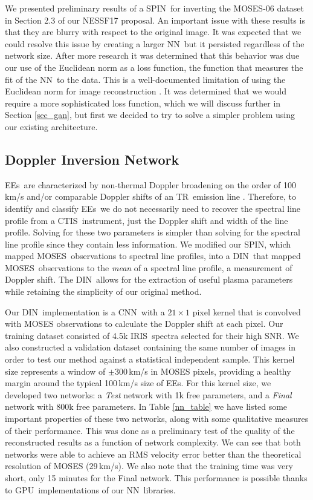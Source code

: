 \documentclass[10pt,letterpaper, doublespace]{article}
\newcommand{\TR}{\ac{TR}}
\newcommand{\EEs}{\acp{EE}}
\newcommand{\CTIS}{\ac{CTIS}}
\newcommand{\MOSES}{\ac{MOSES}}
\newcommand{\NN}{\ac{NN}}
\newcommand{\CNN}{\ac{CNN}}
\newcommand{\DIN}{\ac{DIN}}
\newcommand{\SPIN}{\ac{SPIN}}
\newcommand{\IRIS}{\ac{IRIS}}
\newcommand{\GPU}{\ac{GPU}}
\newcommand{\SNR}{\ac{SNR}}
\begin{document}
		We presented preliminary results of a \SPIN\ for inverting the \MOSES-06 dataset in Section 2.3 of our NESSF17 proposal.
		An important issue with these results is that they are blurry with respect to the original image.
		It was expected that we could resolve this issue by creating a larger \NN\, but it persisted regardless of the network size.
		After more research it was determined that this behavior was due our use of the Euclidean norm as a loss function, the function that measures the fit of the \NN\ to the data.
		This is a well-documented limitation of using the Euclidean norm for image reconstruction \citep{Pathak2016}.
		It was determined that we would require a more sophisticated loss function, which we will discuss further in Section \ref{sec_gan}, but first we decided to try to solve a simpler problem using our existing architecture.
					
		\subsection{Doppler Inversion Network}
		
			\EEs\ are characterized by non-thermal Doppler broadening on the order of 100\,km/s and/or comparable Doppler shifts of an \TR\ emission line \citep{Dere1989}.
			Therefore, to identify and classify \EEs\ we do not necessarily need to recover the spectral line profile from a \CTIS\ instrument, just the Doppler shift and width of the line profile.
			Solving for these two parameters is simpler than solving for the spectral line profile since they contain less information.
			We modified our \SPIN, which mapped \MOSES\ observations to spectral line profiles, into a \DIN\ that mapped \MOSES\ observations to the \textit{mean} of a spectral line profile, a measurement of Doppler shift.
			The \DIN\ allows for the extraction of useful plasma parameters while retaining the simplicity of our original method.
			
			Our \DIN\ implementation is a \CNN\ with a $21\times 1$ pixel kernel that is convolved with MOSES observations to calculate the Doppler shift at each pixel.
			Our training dataset consisted of 4.5k \IRIS\ spectra selected for their high \SNR. We also constructed a validation dataset containing the same number of images in order to test our method against a statistical independent sample.
			This kernel size represents a window of $\pm$300\,km/s in MOSES pixels, providing a healthy margin around the typical 100\,km/s size of \EEs \citep{Dere1994}.
			For this kernel size, we developed two networks: a \textit{Test} network with 1k free parameters, and a \textit{Final} network with 800k free parameters.
			In Table \ref{nn_table} we have listed some important properties of these two networks, along with some qualitative measures of their performance.
			This was done as a preliminary test of the quality of the reconstructed results as a function of network complexity.
			We can see that both networks were able to achieve an RMS velocity error better than the theoretical resolution of MOSES (29\,km/s).
			We also note that the training time was very short, only 15 minutes for the Final network.
			This performance is possible thanks to \GPU\ implementations of our \NN\ libraries.
			
\end{document}
